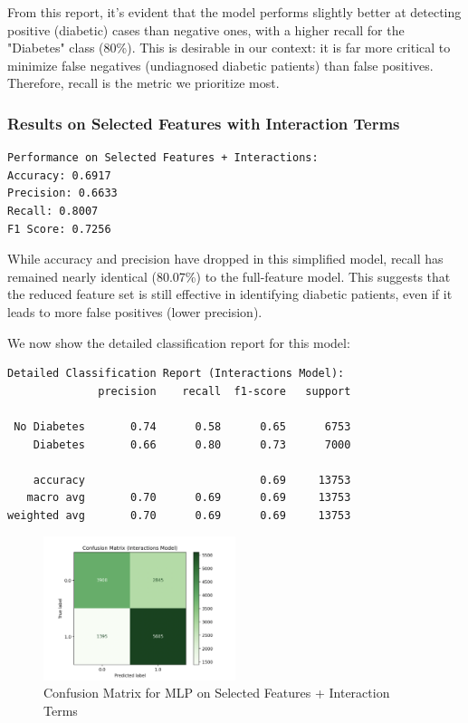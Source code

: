 \noindent
From this report, it's evident that the model performs slightly better at detecting positive (diabetic) cases than negative ones, with a higher recall for the "Diabetes" class (80\%). This is desirable in our context: it is far more critical to minimize false negatives (undiagnosed diabetic patients) than false positives. Therefore, recall is the metric we prioritize most.

\subsubsection{Results on Selected Features with Interaction Terms}

\begin{verbatim}
Performance on Selected Features + Interactions:
Accuracy: 0.6917
Precision: 0.6633
Recall: 0.8007
F1 Score: 0.7256
\end{verbatim}

\noindent
While accuracy and precision have dropped in this simplified model, recall has remained nearly identical (80.07\%) to the full-feature model. This suggests that the reduced feature set is still effective in identifying diabetic patients, even if it leads to more false positives (lower precision).

\vspace{0.5em}
\noindent
We now show the detailed classification report for this model:

\begin{verbatim}
Detailed Classification Report (Interactions Model):
              precision    recall  f1-score   support

 No Diabetes       0.74      0.58      0.65      6753
    Diabetes       0.66      0.80      0.73      7000

    accuracy                           0.69     13753
   macro avg       0.70      0.69      0.69     13753
weighted avg       0.70      0.69      0.69     13753
\end{verbatim}

\begin{figure}[H]
    \centering
    \includegraphics[width=0.5\textwidth]{images/confusion_matrix_interactions.png}
    \caption{Confusion Matrix for MLP on Selected Features + Interaction Terms}
\end{figure}


